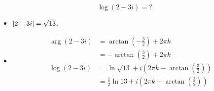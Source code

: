 \documentclass[../ana2u.tex]{subfiles}
\begin{document}
\begin{bsp}
    \[ \log (2-3i) = ? \]
    \begin{itemize}
        \item \( \left|2-3i\right| = \sqrt{13} \).
        \item 
        \begin{align*}   
            \arg(2-3i) &= \arctan \left(-\frac{3}{2}\right) + 2\pi k \\
            &= -\arctan\left(\frac{3}{2}\right) + 2\pi k \\
            \log(2 - 3i) &= \ln \sqrt{13} 
            + i (2\pi k - \arctan \left(\frac{3}{2}\right))\\
            &= \frac{1}{2} \ln 13 
            + i (2 \pi k - \arctan \left(\frac{3}{2}\right))
        \end{align*}
    \end{itemize}
    
\end{bsp}
\end{document}
